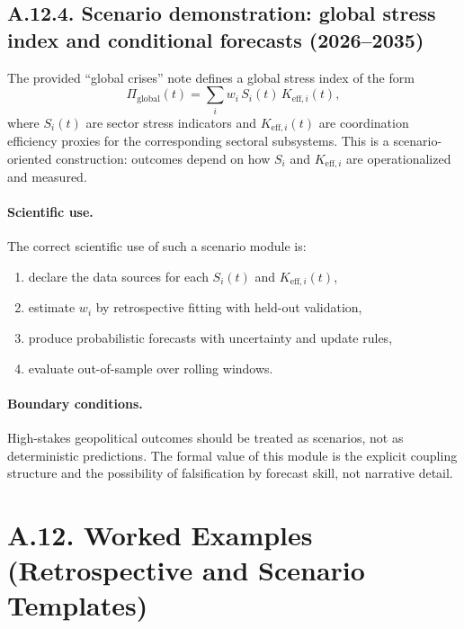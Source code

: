 \documentclass[13pt,a4paper]{article}
\begin{document}
	\subsection*{A.12.4. Scenario demonstration: global stress index and conditional forecasts (2026--2035)}
	
	The provided ``global crises'' note defines a global stress index of the form
	$$
	\Pi_{\mathrm{global}}(t) = \sum_i w_i\,S_i(t)\,K_{\mathrm{eff},i}(t),
	$$
	where $S_i(t)$ are sector stress indicators and $K_{\mathrm{eff},i}(t)$ are coordination efficiency proxies for the corresponding sectoral subsystems. This is a scenario-oriented construction: outcomes depend on how $S_i$ and $K_{\mathrm{eff},i}$ are operationalized and measured.
	
	\paragraph{Scientific use.}
	The correct scientific use of such a scenario module is:
	\begin{enumerate}[leftmargin=*]
		\item declare the data sources for each $S_i(t)$ and $K_{\mathrm{eff},i}(t)$,
		\item estimate $w_i$ by retrospective fitting with held-out validation,
		\item produce probabilistic forecasts with uncertainty and update rules,
		\item evaluate out-of-sample over rolling windows.
	\end{enumerate}
	
	\paragraph{Boundary conditions.}
	High-stakes geopolitical outcomes should be treated as scenarios, not as deterministic predictions. The formal value of this module is the explicit coupling structure and the possibility of falsification by forecast skill, not narrative detail.
	\section*{A.12. Worked Examples (Retrospective and Scenario Templates)}
	\label{sec:worked-examples}
	
\end{document}
